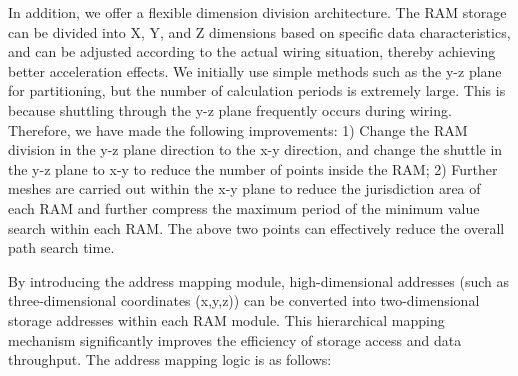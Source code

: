 \documentclass[conference]{IEEEtran}
\begin{document}
In addition, we offer a flexible dimension division architecture. The RAM storage can be divided into X, Y, and Z dimensions based on specific data characteristics, and can be adjusted according to the actual wiring situation, thereby achieving better acceleration effects.
We initially use simple methods such as the y-z plane for partitioning, but the number of calculation periods is extremely large. This is because shuttling through the y-z plane frequently occurs during wiring. Therefore, we have made the following improvements:
1) Change the RAM division in the y-z plane direction to the x-y direction, and change the shuttle in the y-z plane to x-y to reduce the number of points inside the RAM;
2) Further meshes are carried out within the x-y plane to reduce the jurisdiction area of each RAM and further compress the maximum period of the minimum value search within each RAM.
The above two points can effectively reduce the overall path search time.

By introducing the address mapping module, high-dimensional addresses (such as three-dimensional coordinates (x,y,z)) can be converted into two-dimensional storage addresses within each RAM module. 
This hierarchical mapping mechanism significantly improves the efficiency of storage access and data throughput.
The address mapping logic is as follows:
\end{document}
